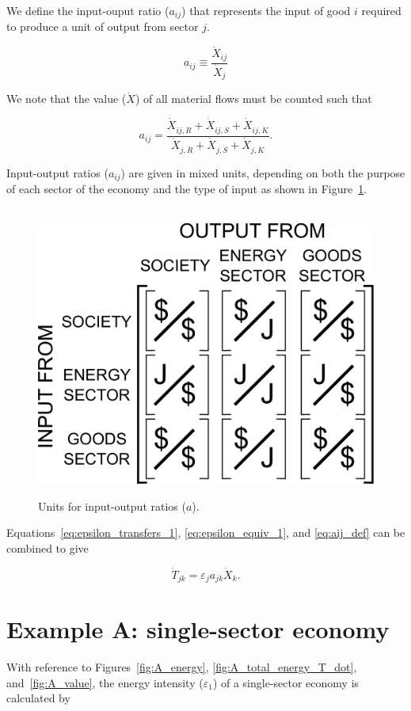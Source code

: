 We define the input-ouput ratio ($a_{ij}$)
that represents the input 
of good $i$ required to produce a unit of output from sector $j$.

\begin{equation} \label{eq:aij_def}
	a_{ij} \equiv \frac{\dot{X}_{ij}}{\dot{X}_{j}}
\end{equation}

We note that the value ($\dot{X}$) of all material flows must be counted such that

\begin{equation} \label{eq:aij_def_expanded}
	a_{ij} =	 
	\frac{\dot{X}_{ij,\dot{R}} + \dot{X}_{ij,\dot{S}} + \dot{X}_{ij,\dot{K}}}
		{\dot{X}_{j,\dot{R}} + \dot{X}_{j,\dot{S}} + \dot{X}_{j,\dot{K}}}.
\end{equation}

Input-output ratios ($a_{ij}$) are given in mixed units, 
depending on both the purpose of each sector of the economy 
and the type of input as shown in Figure~\ref{fig:A_matrix_units}.

\begin{figure}[h!]
\centering\
\includegraphics[width=0.4\linewidth]{Part_2/Chapter_Intensity/images/I-O_units.pdf}
\caption[Units for input-output ratios]{ Units for input-output ratios ($a$).}
\label{fig:A_matrix_units}
\end{figure}

Equations~\ref{eq:epsilon_transfers_1}, 
\ref{eq:epsilon_equiv_1}, and 
\ref{eq:aij_def} can be combined to give

\begin{equation}
	\dot{T}_{jk} = \varepsilon_{j} a_{jk} \dot{X}_{k}.
\end{equation}


\section{Example A: single-sector economy} %

With reference to Figures~\ref{fig:A_energy}, 
\ref{fig:A_total_energy_T_dot}, 
and~\ref{fig:A_value},
the energy intensity ($\varepsilon_{1}$) of a single-sector economy is calculated by

